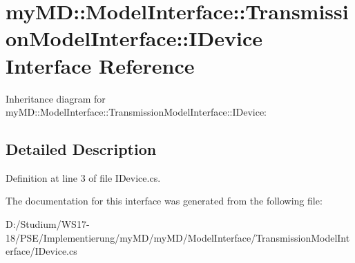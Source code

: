 \hypertarget{interfacemy_m_d_1_1_model_interface_1_1_transmission_model_interface_1_1_i_device}{
\section{my\-MD::Model\-Interface::Transmission\-Model\-Interface::IDevice Interface Reference}
\label{da/d4e/interfacemy_m_d_1_1_model_interface_1_1_transmission_model_interface_1_1_i_device}
}
Inheritance diagram for my\-MD::Model\-Interface::Transmission\-Model\-Interface::IDevice:

\subsection{Detailed Description}




Definition at line 3 of file IDevice.cs.

The documentation for this interface was generated from the following file:\begin{CompactItemize}
\item 
D:/Studium/WS17-18/PSE/Implementierung/my\-MD/my\-MD/Model\-Interface/Transmission\-Model\-Interface/IDevice.cs\end{CompactItemize}
